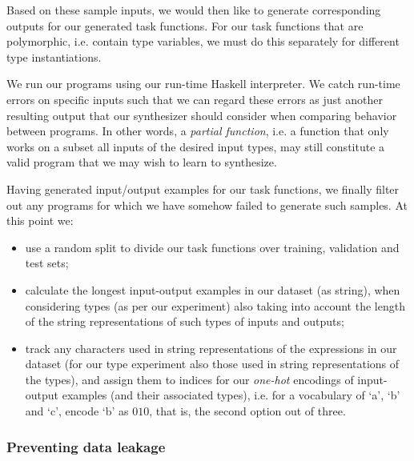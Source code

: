 \documentclass{article}
\begin{document}
Based on these sample inputs, we would then like to generate corresponding outputs for our generated task functions.
For our task functions that are polymorphic, i.e. contain type variables,
we must do this separately for different type instantiations.


We run our programs using our run-time Haskell interpreter.
We catch run-time errors on specific inputs such that
we can regard these errors as just another resulting output
that our synthesizer should consider when comparing behavior between programs.
In other words, a \emph{partial function},
i.e. a function that only works on a subset all inputs of the desired input types,
may still constitute a valid program that we may wish to learn to synthesize.

Having generated input/output examples for our task functions,
we finally filter out any programs for which we have somehow failed to generate such samples.
At this point we:
\begin{itemize}
    \item use a random split to divide our task functions over training, validation and test sets;
    \item calculate the longest input-output examples in our dataset (as string), when considering types (as per our experiment) also taking into account the length of the string representations of such types of inputs and outputs;
    \item track any characters used in string representations of the expressions in our dataset
    (for our type experiment also those used in string representations of the types),
    and assign them to indices for our \emph{one-hot} encodings of input-output examples (and their associated types),
    i.e. for a vocabulary of `a', `b' and `c', encode `b' as $010$,
    that is, the second option out of three.
\end{itemize}

\subsubsection{Preventing data leakage}
\end{document}
